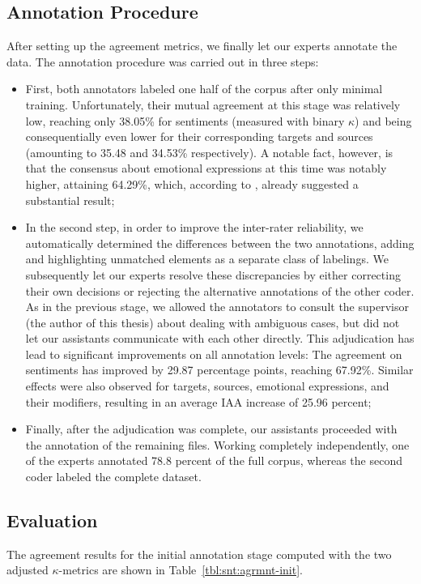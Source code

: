 \subsection{Annotation Procedure}\label{sec:astages}
After setting up the agreement metrics, we finally let our experts
annotate the data.  The annotation procedure was carried out in three
steps:
\begin{itemize}
  \item First, both annotators labeled one half of the corpus after
    only minimal training.  Unfortunately, their mutual agreement at
    this stage was relatively low, reaching only 38.05\% for
    sentiments (measured with binary $\kappa$) and being
    consequentially even lower for their corresponding targets and
    sources (amounting to 35.48 and 34.53\% respectively).  A notable
    fact, however, is that the consensus about emotional expressions
    at this time was notably higher, attaining 64.29\%, which,
    according to \citet{Landis:77}, already suggested a substantial
    result;
  \item In the second step, in order to improve the inter-rater
    reliability, we automatically determined the differences between
    the two annotations, adding and highlighting unmatched elements as
    a separate class of labelings. We subsequently let our experts
    resolve these discrepancies by either correcting their own
    decisions or rejecting the alternative annotations of the other
    coder.  As in the previous stage, we allowed the annotators to
    consult the supervisor (the author of this thesis) about dealing
    with ambiguous cases, but did not let our assistants communicate
    with each other directly.  This adjudication has lead to
    significant improvements on all annotation levels: The agreement
    on sentiments has improved by 29.87 percentage points, reaching
    67.92\%.  Similar effects were also observed for targets, sources,
    emotional expressions, and their modifiers, resulting in an
    average IAA increase of 25.96 percent;
  \item Finally, after the adjudication was complete, our assistants
    proceeded with the annotation of the remaining files.  Working
    completely independently, one of the experts annotated 78.8
    percent of the full corpus, whereas the second coder labeled the
    complete dataset.
\end{itemize}

\subsection{Evaluation}\label{sec:eval}
The agreement results for the initial annotation stage computed with
the two adjusted $\kappa$-metrics are shown in
Table~\ref{tbl:snt:agrmnt-init}.

